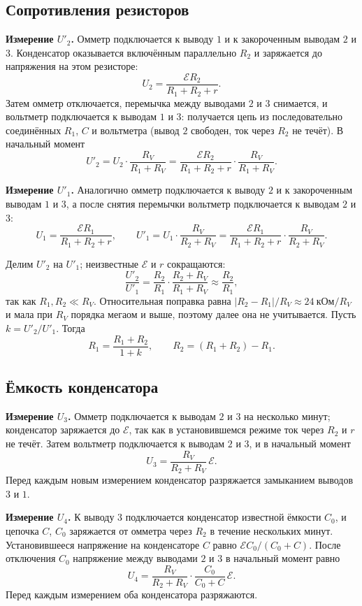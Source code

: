 \documentclass[12pt]{article}
\begin{document}
    \subsection{Сопротивления резисторов}

    \textbf{Измерение $U'_2$.} Омметр подключается к выводу $1$ и к закороченным выводам $2$ и $3$. Конденсатор оказывается включённым параллельно $R_2$ и заряжается до напряжения на этом резисторе:
    \[
        U_2 = \frac{\mathcal{E} R_2}{R_1 + R_2 + r}.
    \]
    Затем омметр отключается, перемычка между выводами $2$ и $3$ снимается, и вольтметр подключается к выводам $1$ и $3$: получается цепь из последовательно соединённых $R_1$, $C$ и вольтметра (вывод $2$ свободен, ток через $R_2$ не течёт). В начальный момент
    \[
        U'_2 = U_2 \cdot \frac{R_V}{R_1 + R_V} = \frac{\mathcal{E} R_2}{R_1 + R_2 + r} \cdot \frac{R_V}{R_1 + R_V}.
    \]

    \textbf{Измерение $U'_1$.} Аналогично омметр подключается к выводу $2$ и к закороченным выводам $1$ и $3$, а после снятия перемычки вольтметр подключается к выводам $2$ и $3$:
    \[
        U_1 = \frac{\mathcal{E} R_1}{R_1 + R_2 + r}, \qquad
        U'_1 = U_1 \cdot \frac{R_V}{R_2 + R_V} = \frac{\mathcal{E} R_1}{R_1 + R_2 + r} \cdot \frac{R_V}{R_2 + R_V}.
    \]

    Делим $U'_2$ на $U'_1$; неизвестные $\mathcal{E}$ и $r$ сокращаются:
    \[
        \frac{U'_2}{U'_1} = \frac{R_2}{R_1} \cdot \frac{R_2 + R_V}{R_1 + R_V} \approx \frac{R_2}{R_1},
    \]
    так как $R_1, R_2 \ll R_V$. Относительная поправка равна $|R_2 - R_1| / R_V \approx 24 \ \text{кОм} / R_V$ и мала при $R_V$ порядка мегаом и выше, поэтому далее она не учитывается. Пусть $k = U'_2 / U'_1$. Тогда
    \[
        R_1 = \frac{R_1 + R_2}{1 + k}, \qquad R_2 = (R_1 + R_2) - R_1.
    \]

    \subsection{Ёмкость конденсатора}

    \textbf{Измерение $U_3$.} Омметр подключается к выводам $2$ и $3$ на несколько минут; конденсатор заряжается до $\mathcal{E}$, так как в установившемся режиме ток через $R_2$ и $r$ не течёт. Затем вольтметр подключается к выводам $2$ и $3$, и в начальный момент
    \[
        U_3 = \frac{R_V}{R_2 + R_V}\,\mathcal{E}.
    \]
    Перед каждым новым измерением конденсатор разряжается замыканием выводов $3$ и $1$.

    \textbf{Измерение $U_4$.} К выводу $3$ подключается конденсатор известной ёмкости $C_0$, и цепочка $C$, $C_0$ заряжается от омметра через $R_2$ в течение нескольких минут. Установившееся напряжение на конденсаторе $C$ равно $\mathcal{E} C_0 / (C_0 + C)$. После отключения $C_0$ напряжение между выводами $2$ и $3$ в начальный момент равно
    \[
        U_4 = \frac{R_V}{R_2 + R_V} \cdot \frac{C_0}{C_0 + C}\,\mathcal{E}.
    \]
    Перед каждым измерением оба конденсатора разряжаются.
\end{document}
